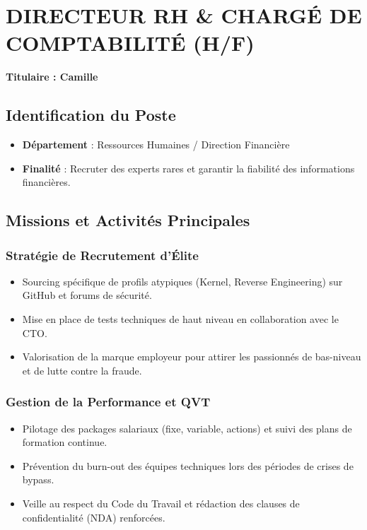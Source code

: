 \documentclass[12pt,a4paper]{article}
\begin{document}
\section{DIRECTEUR RH \& CHARGÉ DE COMPTABILITÉ (H/F)}
\textbf{Titulaire : Camille}

\subsection{Identification du Poste}
\begin{itemize}[label=\textbullet]
    \item \textbf{Département} : Ressources Humaines / Direction Financière
    \item \textbf{Finalité} : Recruter des experts rares et garantir la fiabilité des informations financières.
\end{itemize}

\subsection{Missions et Activités Principales}

\subsubsection{Stratégie de Recrutement d'Élite}
\begin{itemize}[label=\textbullet]
    \item Sourcing spécifique de profils atypiques (Kernel, Reverse Engineering) sur GitHub et forums de sécurité.
    \item Mise en place de tests techniques de haut niveau en collaboration avec le CTO.
    \item Valorisation de la marque employeur pour attirer les passionnés de bas-niveau et de lutte contre la fraude.
\end{itemize}

\subsubsection{Gestion de la Performance et QVT}
\begin{itemize}[label=\textbullet]
    \item Pilotage des packages salariaux (fixe, variable, actions) et suivi des plans de formation continue.
    \item Prévention du burn-out des équipes techniques lors des périodes de crises de bypass.
    \item Veille au respect du Code du Travail et rédaction des clauses de confidentialité (NDA) renforcées.
\end{itemize}
\end{document}
